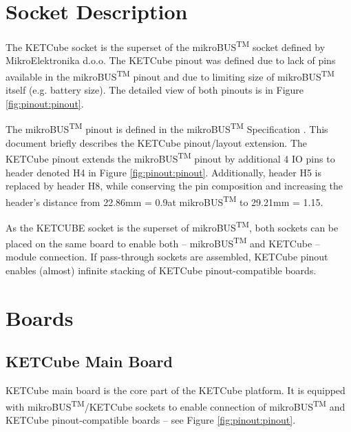 \clearpage
\section{Socket Description}\label{pinout}

The KETCube socket is the superset of the mikroBUS\textsuperscript{TM} socket defined by MikroElektronika d.o.o. The KETCube pinout was defined due to lack of pins available in the mikroBUS\textsuperscript{TM} pinout and due to limiting size of mikroBUS\textsuperscript{TM} itself (e.g. battery size). The detailed view of both pinouts is in Figure \ref{fig:pinout:pinout}.

The mikroBUS\textsuperscript{TM} pinout is defined in the mikroBUS\textsuperscript{TM} Specification \cite{MikroE:mikroBUS}. This document briefly describes the KETCube pinout/layout extension. The KETCube pinout extends the mikroBUS\textsuperscript{TM} pinout by additional 4 IO pins to header denoted H4 in Figure \ref{fig:pinout:pinout}. Additionally, header H5 is replaced by header H8, while conserving the pin composition and increasing the header's distance from 22.86mm = 0.9\textquotedbl at mikroBUS\textsuperscript{TM} to 29.21mm = 1.15\textquotedbl.

As the KETCUBE socket is the superset of mikroBUS\textsuperscript{TM}, both sockets can be placed on the same board to enable both -- mikroBUS\textsuperscript{TM} and KETCube -- module connection. If pass-through sockets are assembled, KETCube pinout enables (almost) infinite stacking of KETCube pinout-compatible boards.


\clearpage
\section{Boards}\label{boards}

\subsection{KETCube Main Board}
  KETCube main board is the core part of the KETCube platform. It is equipped with mikroBUS\textsuperscript{TM}/KETCube sockets to enable connection of mikroBUS\textsuperscript{TM} and KETCube pinout-compatible boards -- see Figure \ref{fig:pinout:pinout}.
  
